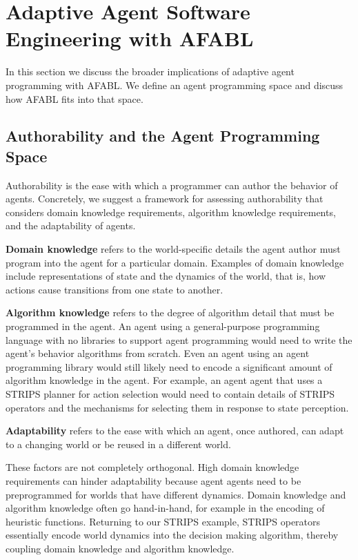 \section{Adaptive Agent Software Engineering with AFABL}

In this section we discuss the broader implications of adaptive agent programming with AFABL. We define an agent programming space and discuss how AFABL fits into that space.

\subsection{Authorability and the Agent Programming Space}

Authorability is the ease with which a programmer can author the behavior of agents.  Concretely, we suggest a framework for assessing authorability that considers domain knowledge requirements, algorithm knowledge requirements, and the adaptability of agents.

{\bf Domain knowledge} refers to the world-specific details the agent author must program into the agent for a particular domain.  Examples of domain knowledge include representations of state and the dynamics of the world, that is, how actions cause transitions from one state to another.

{\bf Algorithm knowledge} refers to the degree of algorithm detail that must be programmed in the agent.  An agent using a general-purpose programming language with no libraries to support agent programming would need to write the agent's behavior algorithms from scratch. Even an agent using an agent programming library would still likely need to encode a significant amount of algorithm knowledge in the agent. For example, an agent agent that uses a STRIPS planner for action selection would need to contain details of STRIPS operators and the mechanisms for selecting them in response to state perception.

{\bf Adaptability} refers to the ease with which an agent, once authored, can adapt to a changing world or be reused in a different world.

These factors are not completely orthogonal.  High domain knowledge requirements can hinder adaptability because agent agents need to be preprogrammed for worlds that have different dynamics.  Domain knowledge and algorithm knowledge often go hand-in-hand, for example in the encoding of heuristic functions.  Returning to our STRIPS example, STRIPS operators essentially encode world dynamics into the decision making algorithm, thereby coupling domain knowledge and algorithm knowledge.

